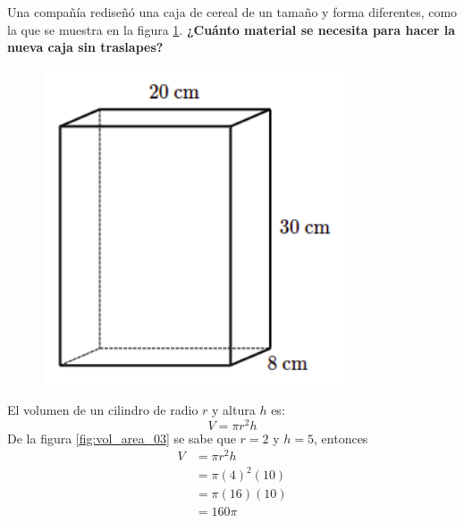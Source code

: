 \question[10] Una compañía rediseñó una caja de cereal de un tamaño y forma diferentes,
como la que se muestra en la figura \ref{fig:prob_verb_superficie_04}.
\textbf{¿Cuánto material se necesita para hacer la nueva caja sin traslapes?}

\begin{minipage}{0.3\linewidth}
    \begin{figure}[H]
        \begin{center}
            \includegraphics[width=0.8\textwidth]{../images/prob_verb_superficie_04}
        \end{center}
        \caption{}
        \label{fig:prob_verb_superficie_04}
    \end{figure}
\end{minipage}
\begin{minipage}{0.7\linewidth}
    \begin{solutionbox}{6cm}
        El volumen de un cilindro de radio $r$ y altura $h$ es:
        \begin{equation*}
            V = \pi r^2 h
        \end{equation*}
        De la figura \ref{fig:vol_area_03} se sabe que $r=2$ y $h=5$, entonces
        \begin{equation*}
            \begin{split}
                V & = \pi r^2 h\\
                & = \pi (4)^2 (10)\\
                & = \pi (16) (10)\\
                & = 160\pi
            \end{split}
        \end{equation*}
    \end{solutionbox}
\end{minipage}